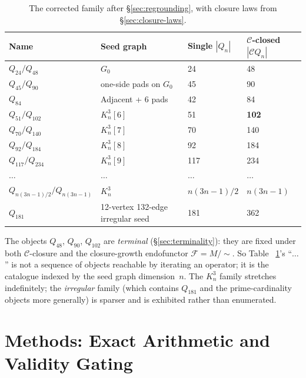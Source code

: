 \documentclass[12pt,a4paper]{article}
\theoremstyle{definition}
\theoremstyle{remark}
\newcommand{\Kn}{K_n^3}
\newcommand{\Qn}{Q_n}
\newcommand{\Ccls}{\mathcal{C}}             %
\newcommand{\Fcls}{\mathcal{F}}             %
\begin{document}
\begin{table}[H]\small
\centering
\caption{The corrected family after \S\ref{sec:regrounding}, with
closure laws from \S\ref{sec:closure-laws}.}\label{tab:family}
\begin{tabular}{@{}llll@{}}
\toprule
Name & Seed graph & Single $|\Qn|$ & $\Ccls$-closed $|\Ccls\Qn|$ \\
\midrule
$Q_{24} / Q_{48}$ & $G_0$ & 24 & 48 \\
$Q_{45} / Q_{90}$ & one-side pads on $G_0$ & 45 & 90 \\
$Q_{84}$          & Adjacent + 6 pads & 42 & 84 \\
$Q_{51} / Q_{102}$ & $\Kn[6]$ & 51 & \textbf{102} \\
$Q_{70} / Q_{140}$ & $\Kn[7]$ & 70 & 140 \\
$Q_{92} / Q_{184}$ & $\Kn[8]$ & 92 & 184 \\
$Q_{117} / Q_{234}$ & $\Kn[9]$ & 117 & 234 \\
$\dots$ & $\dots$ & $\dots$ & $\dots$ \\
$Q_{n(3n-1)/2} / Q_{n(3n-1)}$ & $\Kn$ & $n(3n{-}1)/2$ & $n(3n{-}1)$ \\
$Q_{181}$ & 12-vertex 132-edge irregular seed & 181 & 362 \\
\bottomrule
\end{tabular}
\end{table}

The objects $Q_{48}$, $Q_{90}$, $Q_{102}$ are \emph{terminal}
(\S\ref{sec:terminality}): they are fixed under both $\Ccls$-closure
and the closure-growth endofunctor $\Fcls = M/{\sim}$. So Table~%
\ref{tab:family}'s ``$\dots$'' is not a sequence of objects reachable
by iterating an operator; it is the catalogue indexed by the seed
graph dimension~$n$. The $\Kn$ family stretches indefinitely; the
\emph{irregular} family (which contains $Q_{181}$ and the
prime-cardinality objects more generally) is sparser and is
exhibited rather than enumerated.

\section{Methods: Exact Arithmetic and Validity Gating}\label{sec:methods}
\end{document}
